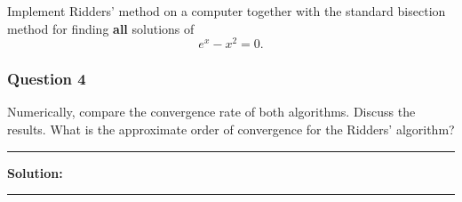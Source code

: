 Implement Ridders' method on a computer together with the standard bisection method for finding \textbf{all} solutions of
$$e^x - x^2 = 0.$$

\subsubsection*{Question 4}

Numerically, compare the convergence rate of both algorithms. Discuss the results. What is the approximate order of convergence for the Ridders' algorithm?

\noindent\rule{\textwidth}{0.4pt}

\vspace{1em}

\textbf{Solution:}


\vspace{2em}
\noindent\rule{\textwidth}{0.4pt}
